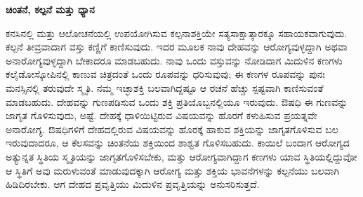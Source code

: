 \begin{center}
\textbf{ಚಿಂತನೆ, ಕಲ್ಪನೆ ಮತ್ತು ಧ್ಯಾನ}
\end{center}

ಕನಸಿನಲ್ಲಿ ಮತ್ತು ಆಲೋಚನೆಯಲ್ಲಿ ಉಪಯೋಗಿಸುವ ಕಲ್ಪನಾಶಕ್ತಿಯೇ ಸತ್ಯಸಾಕ್ಷಾತ್ಕಾರಕ್ಕೂ ಸಹಾಯಕವಾಗುವುದು. ಕಲ್ಪನೆ ತೀವ್ರವಾದಾಗ ವಸ್ತು ಕಣ್ಣಿಗೆ ಕಾಣಿಸುವುದು. ಇದರ ಮೂಲಕ ನಾವು ದೇಹವನ್ನು ಆರೋಗ್ಯವುಳ್ಳದ್ದಾಗಿ ಅಥವಾ ಅನಾರೋಗ್ಯವುಳ್ಳದ್ದಾಗಿ ಬೇಕಾದರೂ ಮಾಡಬಹುದು. ನಾವು ಒಂದು ವಸ್ತುವನ್ನು ನೋಡಿದಾಗ ಮಿದುಳಿನ ಕಣಗಳು ಕಲೈಡೋಸ್ಕೋಪಿನಲ್ಲಿ ಕಾಣುವ ಚಿತ್ರದಂತೆ ಒಂದು ರೂಪವನ್ನು ಧರಿಸುವುವು; ಈ ಕಣಗಳ ರೂಪವನ್ನು ಪುನಃ ಮನಸ್ಸಿನಲ್ಲಿ ತರುವುದೇ ಸ್ಮೃತಿ. ನಮ್ಮ ಇಚ್ಛಾಶಕ್ತಿ ಬಲವಾಗಿದ್ದಷ್ಟೂ ಆ ರಚನೆ ಹೆಚ್ಚು ಸ್ಪಷ್ಟವಾಗಿ ಕಾಣಿಸುವಂತೆ ಮಾಡಬಹುದು. ದೇಹವನ್ನು ಗುಣಪಡಿಸುವ ಒಂದು ಶಕ್ತಿ ಪ್ರತಿಯೊಬ್ಬನಲ್ಲಿಯೂ ಇರುವುದು. ಔಷಧಿ ಈ ಗುಣವನ್ನು ಜಾಗೃತ ಗೊಳಿಸುವುದು, ಅಷ್ಟೆ. ದೇಹಕ್ಕೆ ಧಾಳಿಯಿಟ್ಟಿರುವ ವಿಷಯವನ್ನು ಹೊರಗೆ ಕಳುಹಿಸುವ ಪ್ರಯತ್ನವೇ ಅನಾರೋಗ್ಯ. ಔಷಧಿಗಳಿಗೆ ದೇಹದಲ್ಲಿರುವ ವಿಷಯವನ್ನು ಹೊರಕ್ಕೆ ಹಾಕುವ ಶಕ್ತಿಯನ್ನು ಜಾಗೃತಗೊಳಿಸುವ ಬಲ ಇರುವುದಾದರೂ, ಆ ಕೆಲಸವನ್ನು ಚಿಂತನೆಯ ಶಕ್ತಿಯಿಂದ ಶಾಶ್ವತ ಗೊಳಿಸಬಹುದು. ಕಾಯಿಲೆ ಬಂದಾಗ ಆರೋಗ್ಯದ ಅತ್ಯುನ್ನತ ಸ್ಥಿತಿಯ ಸ್ಮೃತಿಯನ್ನು ಜಾಗೃತಗೊಳಿಸಬೇಕು, ಮತ್ತು ಆರೋಗ್ಯವಾಗಿದ್ದಾಗ ಕಣಗಳು ಯಾವ ಸ್ಥಿತಿಯಲ್ಲಿದ್ದುವೋ ಆ ಸ್ಥಿತಿಗೆ ಅವು ಮರುಳುವಂತೆ ಮಾಡುವುದಕ್ಕಾಗಿ ಆರೋಗ್ಯ ಮತ್ತು ಶಕ್ತಿಯ ಭಾವನೆಗಳನ್ನು ಕಲ್ಪನೆಯು ಬಲವಾಗಿ ಹಿಡಿದಿರಬೇಕು. ಆಗ ದೇಹದ ಪ್ರವೃತ್ತಿಯು ಮಿದುಳಿನ ಪ್ರವೃತ್ತಿಯನ್ನು ಅನುಸರಿಸುತ್ತದೆ.

